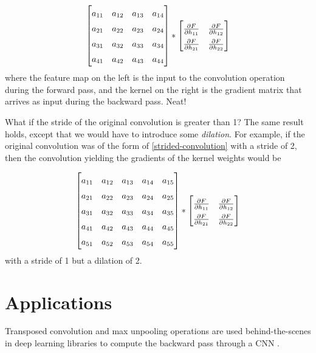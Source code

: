 \documentclass{article}[a4paper]
\begin{document}
\begin{equation*}
	\begin{bmatrix}
		a_{11} & a_{12} & a_{13} & a_{14} \\
		a_{21} & a_{22} & a_{23} & a_{24} \\
		a_{31} & a_{32} & a_{33} & a_{34} \\
		a_{41} & a_{42} & a_{43} & a_{44} \\
	\end{bmatrix} *
	\renewcommand{\arraystretch}{1.5}
	\begin{bmatrix}
		\frac{\partial F}{\partial h_{11}} & \frac{\partial F}{\partial h_{12}} \\
		\frac{\partial F}{\partial h_{21}} & \frac{\partial F}{\partial h_{22}}
	\end{bmatrix}
\end{equation*}
where the feature map on the left is the input to the convolution operation during the forward pass, and the kernel on the right is the gradient matrix that arrives as input during the backward pass. Neat!

What if the stride of the original convolution is greater than 1? The same result holds, except that we would have to introduce some \textit{dilation}. For example, if the original convolution was of the form of \eqref{strided-convolution} with a stride of 2, then the convolution yielding the gradients of the kernel weights would be

\begin{equation*}
	\begin{bmatrix}
		a_{11} & a_{12} & a_{13} & a_{14} & a_{15} \\
		a_{21} & a_{22} & a_{23} & a_{24} & a_{25} \\
		a_{31} & a_{32} & a_{33} & a_{34} & a_{35} \\
		a_{41} & a_{42} & a_{43} & a_{44} & a_{45} \\
		a_{51} & a_{52} & a_{53} & a_{54} & a_{55}
	\end{bmatrix} *
	\renewcommand{\arraystretch}{1.5}
	\begin{bmatrix}
		\frac{\partial F}{\partial h_{11}} & \frac{\partial F}{\partial h_{12}} \\
		\frac{\partial F}{\partial h_{21}} & \frac{\partial F}{\partial h_{22}}
	\end{bmatrix}
\end{equation*}
with a stride of 1 but a dilation of 2.

\section{Applications}
Transposed convolution and max unpooling operations are used behind-the-scenes in deep learning libraries to compute the backward pass through a CNN \cite{pytorchsourcecode}.
\end{document}
